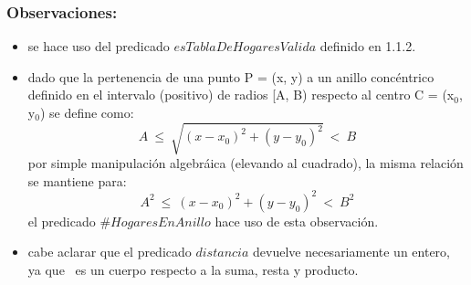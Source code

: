     \subsubsection{Observaciones:}
        \begin{itemize}
            \item se hace uso del predicado $esTablaDeHogaresValida$ definido en 1.1.2.
            \item dado que la pertenencia de una punto P = (x, y) a un anillo concéntrico definido en el intervalo (positivo) de radios [A, B) respecto al centro C = (x$_{0}$, y$_{0}$) se define como: 
                \begin{equation}
                    A\ \leq\ \sqrt{(x - x_{0})^{2} + (y - y_{0})^{2}}\ <\ B
                \end{equation}
                por simple manipulación algebráica (elevando al cuadrado), la misma relación se mantiene para:
                \begin{equation}
                    A^{2}\ \leq\ (x - x_{0})^{2} + (y - y_{0})^{2}\ <\ B^{2}
                \end{equation}
                el predicado $\#HogaresEnAnillo$ hace uso de esta observaci\'on.
            \item cabe aclarar que el predicado $distancia$ devuelve necesariamente un entero, ya que \ent\ es un cuerpo respecto a
            la suma, resta y producto. 
        \end{itemize}